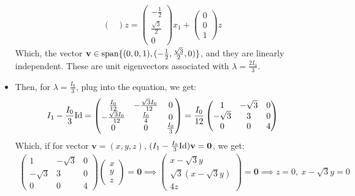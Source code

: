 \documentclass{article}
\newcommand{\Id}{\textmd{Id}} %
\newcommand{\bv}{\textbf{v}} %
\newcommand{\bzero}{\textbf{0}}
\begin{document}
\begin{itemize}
\begin{align}
\begin{pmatrix}
        \end{pmatrix}z = \begin{pmatrix}
            -\frac{1}{2}\\\frac{\sqrt{3}}{2}\\0
        \end{pmatrix}x_1 + \begin{pmatrix}
            0\\0\\1
        \end{pmatrix}z
    \end{align}
    Which, the vector $\bv \in \textmd{span}\{(0,0,1),(-\frac{1}{2},\frac{\sqrt{3}}{2},0)\}$, and they are linearly independent. These are unit eigenvectors associated with $\lambda=\frac{2I_0}{3}$.
    \item Then, for $\lambda=\frac{I_0}{3}$, plug into the equation, we get:
    \begin{align}
        I_1-\frac{I_0}{3}\Id = \begin{pmatrix}
            \frac{I_0}{12}&-\frac{\sqrt{3}I_0}{12}&0\\
            -\frac{\sqrt{3}I_0}{12}&\frac{I_0}{4}&0\\
            0&0&\frac{I_0}{3}
        \end{pmatrix}=\frac{I_0}{12}\begin{pmatrix}
            1&-\sqrt{3}&0\\
            -\sqrt{3}&3&0\\
            0&0&4
        \end{pmatrix}
    \end{align}
    Which, if for vector $\bv = (x,y,z)$, $(I_1-\frac{I_0}{3}\Id)\bv=\bzero$, we get:
    \begin{align}
        \begin{pmatrix}
            1&-\sqrt{3}&0\\
            -\sqrt{3}&3&0\\
            0&0&4
        \end{pmatrix}\begin{pmatrix}
            x\\y\\z
        \end{pmatrix} = \bzero \implies \begin{pmatrix}
            x-\sqrt{3}y\\ \sqrt{3}(x-\sqrt{3}y)\\ 4z
        \end{pmatrix}=\bzero\implies z=0,\ x-\sqrt{3}y=0

\end{align}
\end{itemize}
\end{document}
